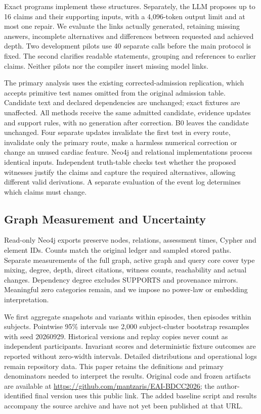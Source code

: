 \documentclass[runningheads]{llncs}
\begin{document}
Exact programs implement these structures. Separately, the LLM proposes up
to 16 claims and their supporting inputs, with a 4,096-token output limit
and at most one repair. We evaluate the links actually generated, retaining
missing answers, incomplete alternatives and differences between requested
and achieved depth. Two development pilots use 40 separate calls before the
main protocol is fixed. The second clarifies readable statements, grouping
and references to earlier claims. Neither pilots nor the compiler insert
missing model links.

The primary analysis uses the existing corrected-admission replication, which
accepts primitive test names omitted from the original admission table.
Candidate text and declared dependencies are unchanged; exact fixtures are unaffected.
All methods receive the same admitted candidate, evidence updates and support
rules, with no generation after correction. B0 leaves the candidate unchanged.
Four separate updates invalidate the first test in every route, invalidate
only the primary route, make a harmless numerical correction or change an
unused cardiac feature. Neo4j and relational implementations process identical
inputs. Independent truth-table checks test whether the proposed witnesses
justify the claims and capture the required alternatives, allowing different
valid derivations. A separate evaluation of the event log determines which
claims must change.




\subsection{Graph Measurement and Uncertainty}

Read-only Neo4j exports preserve nodes, relations, assessment times, Cypher and
element IDs. Counts match the original ledger and sampled stored paths.
Separate measurements of the full graph, active graph and query core cover type mixing, degree, depth, direct citations, witness counts, reachability
and actual changes. Dependency degree excludes SUPPORTS and provenance mirrors.
Meaningful zero categories remain, and we impose no power-law or embedding
interpretation.

We first aggregate snapshots and variants within episodes, then episodes within
subjects. Pointwise 95\% intervals use 2,000 subject-cluster bootstrap resamples
with seed 20260929. Historical versions and replay copies never count as
independent participants. Invariant scores and deterministic fixture outcomes
are reported without zero-width intervals. Detailed distributions and operational logs remain
repository data. This paper retains the definitions and primary denominators
needed to interpret the results.
Original code and frozen artifacts are available at
\url{https://github.com/mantzaris/EAI-BDCC2026}; the author-identified final version
uses this public link. The added baseline script and results accompany the source
archive and have not yet been published at that URL.
\end{document}
